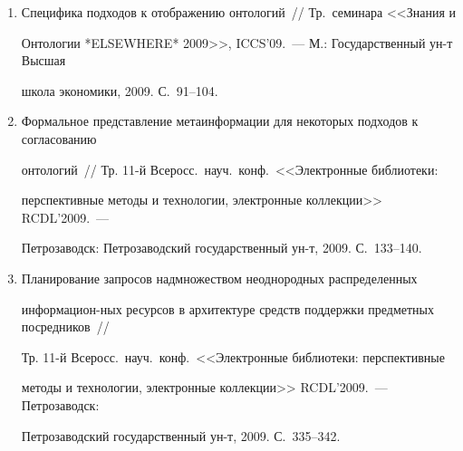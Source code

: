 \begin{enumerate}[1.]
Формирование выражений взглядов в задаче регистрации ресурсов в предметных 


посредниках~// Тр. 11-й Всеросс.\ науч.\ конф.\ <<Электронные 


библиотеки: перспективные методы и технологии, электронные коллекции>> 


RCDL'2009.~--- Петрозаводск: Петрозаводский государственный университет, 2009. 


С.~343--349.





\item {}


Специфика подходов к отображению онтологий~// Тр.\ семинара <<Знания и 


Онтологии *ELSEWHERE* 2009>>, ICCS'09.~--- М.: Государственный ун-т Высшая 


школа экономики, 2009. С.~91--104.





\item {}


Формальное представление метаинформации для некоторых подходов к согласованию 


онтологий~// Тр. 11-й Всеросс.\ науч.\ конф.\ <<Электронные биб\-ли\-о\-те\-ки: 


перспективные методы и технологии, электронные коллекции>> RCDL'2009.~--- 


Петрозаводск: Петрозаводский государственный ун-т, 2009. С.~133--140.





\item {}


Планирование запросов над\linebreak множеством неоднородных распределенных 


информацион-\linebreak ных ресурсов в архитектуре средств поддержки предметных посредников~// 


Тр. 11-й Всеросс.\ науч.\ конф.\ <<Электронные библиотеки: перспективные 


методы и технологии, электронные коллекции>> RCDL'2009.~--- Пет\-ро\-за\-водск: 


Пет\-ро\-за\-вод\-ский государственный ун-т, 2009. С.~335--342.






\end{enumerate}
